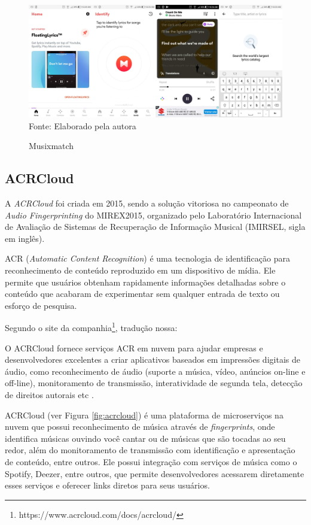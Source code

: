 \begin{figure}[!htb]
   \centering
   \caption{Musixmatch}\label{fig:musixmatch} 
   \includegraphics[scale=0.12]{figuras/musixmatch.jpg}
   \\Fonte: Elaborado pela autora
\end{figure}

\subsection{ACRCloud} \label{subsec:acrcloud} %
A \textit{ACRCloud} foi criada em 2015, sendo a solução vitoriosa no campeonato de \textit{Audio Fingerprinting} do MIREX2015, organizado pelo Laboratório Internacional de Avaliação de Sistemas de Recuperação de Informação Musical (IMIRSEL, sigla em inglês).

ACR (\textit{Automatic Content Recognition}) é uma tecnologia de identificação para reconhecimento de conteúdo reproduzido em um dispositivo de mídia. Ele permite que usuários obtenham rapidamente informações detalhadas sobre o conteúdo que acabaram de experimentar sem qualquer entrada de texto ou esforço de pesquisa.

Segundo o site da companhia\footnote{https://www.acrcloud.com/docs/acrcloud/}, tradução nossa:

\begin{citacao}
O ACRCloud fornece serviços ACR em nuvem para ajudar empresas e desenvolvedores excelentes a criar aplicativos baseados em impressões digitais de áudio, como reconhecimento de áudio (suporte a música, vídeo, anúncios on-line e off-line), monitoramento de transmissão, interatividade de segunda tela, detecção de direitos autorais etc \cite{acrcloud2015}.
\end{citacao}

ACRCloud (ver Figura \ref{fig:acrcloud}) é uma plataforma de microserviços na nuvem que possui reconhecimento de música através de \textit{fingerprints}, onde identifica músicas ouvindo você cantar ou de músicas que são tocadas ao seu redor, além do monitoramento de transmissão com identificação e apresentação de conteúdo, entre outros. Ele possui integração com serviços de música como o Spotify, Deezer, entre outros, que permite desenvolvedores acessarem diretamente esses serviços e oferecer links diretos para seus usuários.

